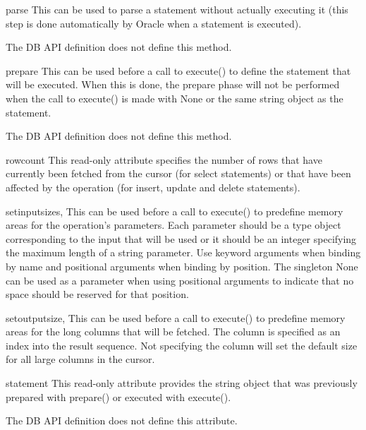 \documentclass{manual}
\begin{document}
\begin{funcdesc}{parse}{}
  This can be used to parse a statement without actually executing it (this
  step is done automatically by Oracle when a statement is executed).

   The DB API definition does not define this method.
\end{funcdesc}

\begin{funcdesc}{prepare}{}
  This can be used before a call to execute() to define the statement that will
  be executed. When this is done, the prepare phase will not be performed when
  the call to execute() is made with None or the same string object as the
  statement.

   The DB API definition does not define this method.
\end{funcdesc}

\begin{datadesc}{rowcount}
  This read-only attribute specifies the number of rows that have currently
  been fetched from the cursor (for select statements) or that have been
  affected by the operation (for insert, update and delete statements).
\end{datadesc}

\begin{funcdesc}{setinputsizes}{, }
  This can be used before a call to execute() to predefine memory areas for the
  operation's parameters. Each parameter should be a type object corresponding
  to the input that will be used or it should be an integer specifying the
  maximum length of a string parameter. Use keyword arguments when binding by
  name and positional arguments when binding by position. The singleton None
  can be used as a parameter when using positional arguments to indicate that
  no space should be reserved for that position.
\end{funcdesc}

\begin{funcdesc}{setoutputsize}{, }
  This can be used before a call to execute() to predefine memory areas for the
  long columns that will be fetched. The column is specified as an index into
  the result sequence. Not specifying the column will set the default size for
  all large columns in the cursor.
\end{funcdesc}

\begin{datadesc}{statement}
  This read-only attribute provides the string object that was previously
  prepared with prepare() or executed with execute().

   The DB API definition does not define this attribute.
\end{datadesc}
\end{document}
